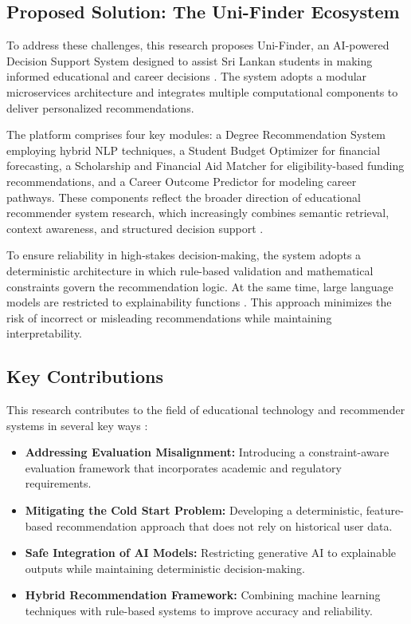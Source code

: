 \documentclass[conference]{IEEEtran}
\begin{document}
\subsection{Proposed Solution: The Uni-Finder Ecosystem}
To address these challenges, this research proposes Uni-Finder, an AI-powered Decision Support System designed to assist Sri Lankan students in making informed educational and career decisions \cite{jamil2021review, elhalees2021towards, kardan2024conceptualisation}. The system adopts a modular microservices architecture and integrates multiple computational components to deliver personalized recommendations.

The platform comprises four key modules: a Degree Recommendation System employing hybrid NLP techniques, a Student Budget Optimizer for financial forecasting, a Scholarship and Financial Aid Matcher for eligibility-based funding recommendations, and a Career Outcome Predictor for modeling career pathways. These components reflect the broader direction of educational recommender system research, which increasingly combines semantic retrieval, context awareness, and structured decision support \cite{wang2018research, silva2026systematic, chen2025integrating}.

To ensure reliability in high-stakes decision-making, the system adopts a deterministic architecture in which rule-based validation and mathematical constraints govern the recommendation logic. At the same time, large language models are restricted to explainability functions \cite{springer2024genai_sl, wang2023finding, ieee2026adaptiveui}. This approach minimizes the risk of incorrect or misleading recommendations while maintaining interpretability.

\subsection{Key Contributions}
This research contributes to the field of educational technology and recommender systems in several key ways \cite{wang2018research, kardan2024conceptualisation}:

\begin{itemize}
    \item \textbf{Addressing Evaluation Misalignment:} Introducing a constraint-aware evaluation framework that incorporates academic and regulatory requirements.
    \item \textbf{Mitigating the Cold Start Problem:} Developing a deterministic, feature-based recommendation approach that does not rely on historical user data.
    \item \textbf{Safe Integration of AI Models:} Restricting generative AI to explainable outputs while maintaining deterministic decision-making.
    \item \textbf{Hybrid Recommendation Framework:} Combining machine learning techniques with rule-based systems to improve accuracy and reliability.
\end{itemize}
\end{document}
